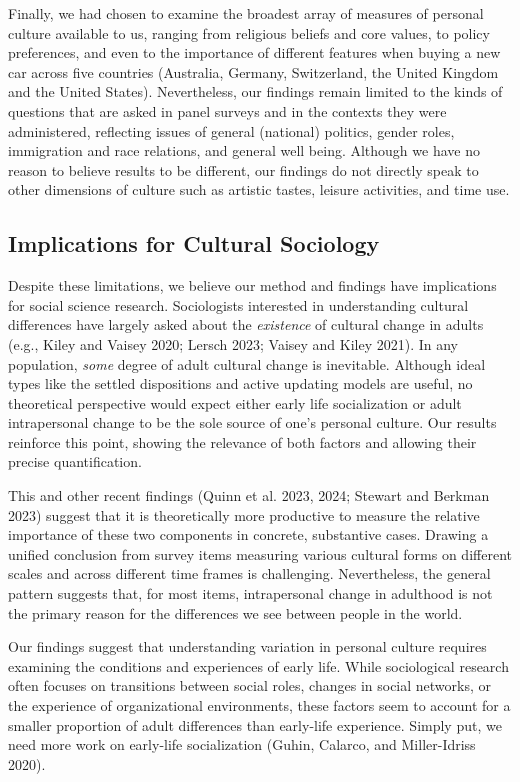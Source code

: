 \documentclass[
  12pt,
]{article}
\begin{document}
Finally, we had chosen to examine the broadest array of measures of
personal culture available to us, ranging from religious beliefs and
core values, to policy preferences, and even to the importance of
different features when buying a new car across five countries
(Australia, Germany, Switzerland, the United Kingdom and the United
States). Nevertheless, our findings remain limited to the kinds of
questions that are asked in panel surveys and in the contexts they were
administered, reflecting issues of general (national) politics, gender
roles, immigration and race relations, and general well being. Although
we have no reason to believe results to be different, our findings do
not directly speak to other dimensions of culture such as artistic
tastes, leisure activities, and time use.

\hypertarget{implications-for-cultural-sociology}{%
\subsection{Implications for Cultural
Sociology}\label{implications-for-cultural-sociology}}

Despite these limitations, we believe our method and findings have
implications for social science research. Sociologists interested in
understanding cultural differences have largely asked about the
\emph{existence} of cultural change in adults (e.g., Kiley and Vaisey
2020; Lersch 2023; Vaisey and Kiley 2021). In any population,
\emph{some} degree of adult cultural change is inevitable. Although
ideal types like the settled dispositions and active updating models are
useful, no theoretical perspective would expect either early life
socialization or adult intrapersonal change to be the sole source of
one's personal culture. Our results reinforce this point, showing the
relevance of both factors and allowing their precise quantification.

This and other recent findings (Quinn et al. 2023, 2024; Stewart and
Berkman 2023) suggest that it is theoretically more productive to
measure the relative importance of these two components in concrete,
substantive cases. Drawing a unified conclusion from survey items
measuring various cultural forms on different scales and across
different time frames is challenging. Nevertheless, the general pattern
suggests that, for most items, intrapersonal change in adulthood is not
the primary reason for the differences we see between people in the
world.

Our findings suggest that understanding variation in personal culture
requires examining the conditions and experiences of early life. While
sociological research often focuses on transitions between social roles,
changes in social networks, or the experience of organizational
environments, these factors seem to account for a smaller proportion of
adult differences than early-life experience. Simply put, we need more
work on early-life socialization (Guhin, Calarco, and Miller-Idriss
2020).
\end{document}

